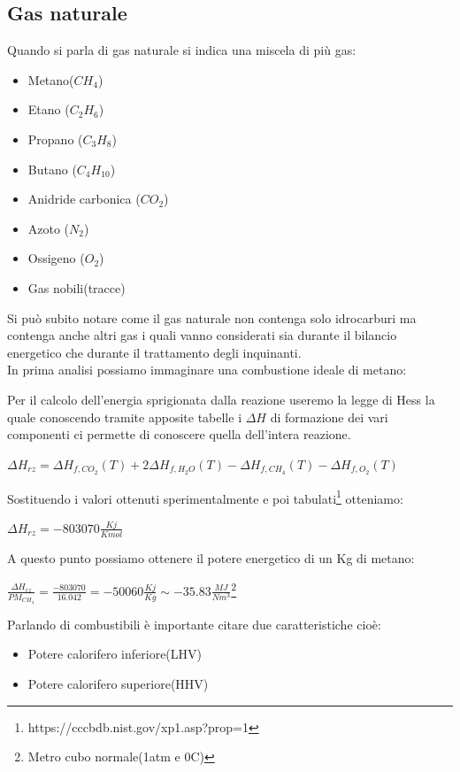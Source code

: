 \subsection{Gas naturale}
Quando si parla di gas naturale si indica una miscela di più gas:
\begin{itemize}
    \item Metano($C H_4$)
    \item Etano ($C_2 H_6$)
    \item Propano ($C_3 H_8$)
    \item Butano ($C_4 H_10$)
    \item Anidride carbonica ($C O_2$)
    \item Azoto ($N_2$)
    \item Ossigeno ($O_2$)
    \item Gas nobili(tracce)
\end{itemize}
Si può subito notare come il gas naturale non contenga solo idrocarburi ma contenga anche altri gas i quali vanno considerati sia durante il bilancio energetico che durante il trattamento degli inquinanti.\\
In prima analisi possiamo immaginare una combustione ideale di metano:
\begin{center}
\end{center}
Per il calcolo dell'energia sprigionata dalla reazione useremo la legge di Hess la quale conoscendo tramite apposite tabelle i $\Delta H$ di formazione dei vari componenti ci permette di conoscere quella dell'intera reazione.
\begin{center}
    \large{$\Delta H_{rz} = \Delta H_{f,CO_2}(T) + 2\Delta H_{f,H_2O}(T) - \Delta H_{f,CH_4}(T) - \Delta H_{f,O_2}(T) $}
\end{center}
Sostituendo i valori ottenuti sperimentalmente e poi tabulati\footnote{https://cccbdb.nist.gov/xp1.asp?prop=1} otteniamo:
\begin{center}
    \large{$\Delta H_{rz} = -803070\frac{Kj}{Kmol} $}
\end{center}
A questo punto possiamo ottenere il potere energetico di un Kg di metano:
\begin{center}
    \large{$\frac{\Delta H_{rz}}{PM_{CH_4}} = \frac{-803070}{16.042} = -50060 \frac{Kj}{Kg} \sim -35.83 \frac{MJ}{Nm^3}$\footnote{Metro cubo normale(1atm e 0\degree C)}}
\end{center}
\newpage\noindent
Parlando di combustibili è importante citare due caratteristiche cioè:
\begin{itemize}
    \item Potere calorifero inferiore(LHV)
    \item Potere calorifero superiore(HHV)
\end{itemize}
